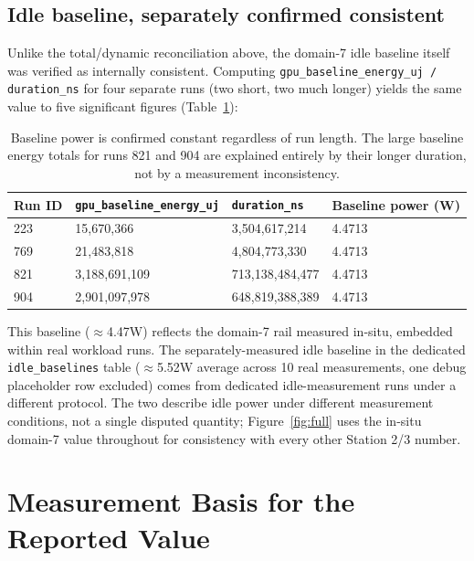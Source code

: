 \documentclass[10pt]{article}
\begin{document}
\subsection{Idle baseline, separately confirmed consistent}

Unlike the total/dynamic reconciliation above, the domain-7 idle baseline
itself was verified as internally consistent. Computing
\texttt{gpu\_baseline\_energy\_uj / duration\_ns} for four separate runs
(two short, two much longer) yields the same value to five significant
figures (Table~\ref{tab:baseline}):

\begin{table}[h]
\centering
\small
\begin{tabularx}{\textwidth}{lXXX}
\toprule
\textbf{Run ID} & \textbf{\texttt{gpu\_baseline\_energy\_uj}} & \textbf{\texttt{duration\_ns}} & \textbf{Baseline power (W)} \\
\midrule
223 & 15{,}670{,}366 & 3{,}504{,}617{,}214 & 4.4713 \\
769 & 21{,}483{,}818 & 4{,}804{,}773{,}330 & 4.4713 \\
821 & 3{,}188{,}691{,}109 & 713{,}138{,}484{,}477 & 4.4713 \\
904 & 2{,}901{,}097{,}978 & 648{,}819{,}388{,}389 & 4.4713 \\
\bottomrule
\end{tabularx}
\vspace{-2pt}
\caption{Baseline power is confirmed constant regardless of run length. The
large baseline energy totals for runs 821 and 904 are explained entirely by
their longer duration, not by a measurement inconsistency.}
\label{tab:baseline}
\end{table}

This baseline ($\approx$4.47W) reflects the domain-7 rail measured
in-situ, embedded within real workload runs. The separately-measured idle
baseline in the dedicated \texttt{idle\_baselines} table ($\approx$5.52W
average across 10 real measurements, one debug placeholder row excluded)
comes from dedicated idle-measurement runs under a different protocol. The
two describe idle power under different measurement conditions, not a
single disputed quantity; Figure~\ref{fig:full} uses the in-situ domain-7 value
throughout for consistency with every other Station 2/3 number.

\section{Measurement Basis for the Reported Value}
\label{sec:conservative}
\end{document}
